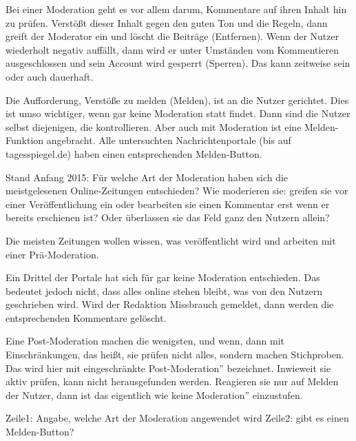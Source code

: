 



Bei einer Moderation geht es vor allem darum, Kommentare auf ihren Inhalt hin zu prüfen. Verstößt dieser Inhalt gegen den guten Ton und die Regeln, dann greift der Moderator ein und löscht die Beiträge (Entfernen). Wenn der Nutzer wiederholt negativ auffällt, dann wird er unter Umständen vom Kommentieren ausgeschlossen und sein Account wird gesperrt (Sperren). Das kann zeitweise sein oder auch dauerhaft.   

Die Aufforderung, Verstöße zu melden (Melden), ist an die Nutzer gerichtet. Dies ist umso wichtiger, wenn gar keine Moderation statt findet. Dann sind die Nutzer selbst diejenigen, die kontrollieren. Aber auch mit Moderation ist eine Melden-Funktion angebracht. Alle  untersuchten Nachrichtenportale (bis auf tagesspiegel.de) haben einen entsprechenden Melden-Button.

Stand Anfang 2015: Für welche Art der Moderation haben sich die meistgelesenen Online-Zeitungen entschieden? Wie moderieren sie: greifen sie vor einer Veröffentlichung ein oder bearbeiten sie einen Kommentar erst wenn er bereits erschienen ist? Oder überlassen sie das Feld ganz den Nutzern allein? 

Die meisten Zeitungen wollen wissen, was veröffentlicht wird und arbeiten mit einer Prä-Moderation. 

Ein Drittel der Portale hat sich für gar keine Moderation entschieden. Das bedeutet jedoch nicht, dass alles online stehen bleibt, was von den Nutzern geschrieben wird. Wird der Redaktion Missbrauch gemeldet, dann werden die entsprechenden Kommentare gelöscht. 

Eine Post-Moderation machen die wenigsten, und wenn, dann mit Einschränkungen, das heißt, sie prüfen nicht alles, sondern machen Stichproben. Das wird hier mit \glqq eingeschränkte Post-Moderation'' bezeichnet. Inwieweit sie aktiv prüfen, kann nicht herausgefunden werden. Reagieren sie nur auf Melden der Nutzer, dann ist das eigentlich wie \glqq keine Moderation'' einzustufen.

Zeile1: Angabe, welche Art der Moderation angewendet wird
Zeile2: gibt es einen Melden-Button?



